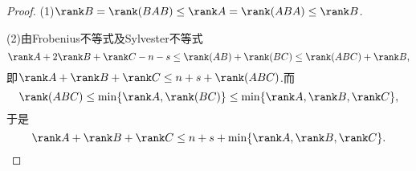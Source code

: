 \begin{proof}
	(1)$\rank B=\rank(BAB)\le\rank A=\rank(ABA)\le\rank B$.\par
	(2)由Frobenius不等式及Sylvester不等式
	\[
		\rank A+2\rank B+\rank C-n-s\le\rank(AB)+\rank(BC)\le\rank(ABC)+\rank B,
	\]
	即$\rank A+\rank B+\rank C\le n+s+\rank(ABC)$.而
	\[
		\rank(ABC)\le\min\{\rank A,\rank(BC)\}\le\min\{\rank A,\rank B,\rank C\},
	\]
	于是
	\[
		\rank A+\rank B+\rank C\le n+s+\min\{\rank A,\rank B,\rank C\}.
	\]
\end{proof}